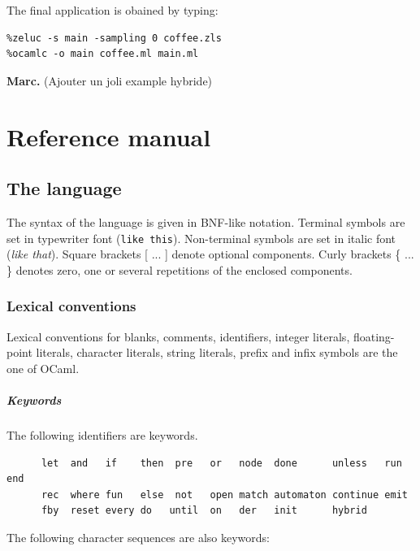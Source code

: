 \documentclass[11pt,titlepage,twoside]{report}
\newcommand{\ocaml}{{\sf OCaml}}
\newcommand{\Marc}[1]{{\bf Marc.} ({#1})}
\newcommand{\term}[1]{{\tt #1}}
\newcommand{\nterm}[1]{{\em #1}}
\begin{document}
The final application is obained by typing:

\begin{verbatim}
%zeluc -s main -sampling 0 coffee.zls
%ocamlc -o main coffee.ml main.ml
\end{verbatim}

\Marc{Ajouter un joli example hybride}

\cleardoublepage

\part{Reference manual}
\label{reference-manual}
\cleardoublepage
\chapter{The language}


The syntax of the language is given in BNF-like notation. Terminal
symbols are set in typewriter font (\term{like this}). Non-terminal symbols
are set in italic font (\nterm{like that}). Square brackets [ ... ] denote
optional components. Curly brackets \{ ... \} denotes zero, one or several
repetitions of the enclosed components.


\section{Lexical conventions}

Lexical conventions for blanks, comments, identifiers, integer
literals, floating-point literals, character literals, string
literals, prefix and infix symbols are the one of \ocaml.

\subsubsection{Keywords}
The following identifiers are keywords.

\begin{verbatim}
      let  and   if    then  pre   or   node  done      unless   run   end
      rec  where fun   else  not   open match automaton continue emit
      fby  reset every do   until  on   der   init      hybrid
\end{verbatim}
The following character sequences are also keywords:
\end{document}

